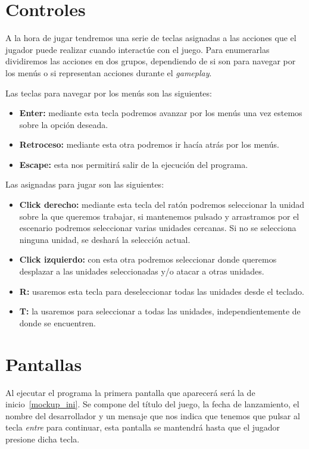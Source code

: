 \section{Controles}
A la hora de jugar tendremos una serie de teclas asignadas a las acciones que el
jugador puede realizar cuando interactúe con el juego. Para enumerarlas dividiremos las
acciones en dos grupos, dependiendo de si son para navegar por los menús o si
representan acciones durante el \textit{gameplay}.

Las teclas para navegar por los menús son las siguientes:

\begin{itemize}
	\item \textbf{Enter:} mediante esta tecla podremos avanzar por los menús una vez estemos sobre la opción deseada.
	\item \textbf{Retroceso:} mediante esta otra podremos ir hacía atrás por los menús.
	\item \textbf{Escape:} esta nos permitirá salir de la ejecución del programa.
\end{itemize}

Las asignadas para jugar son las siguientes:

\begin{itemize}
	\item \textbf{Click derecho:} mediante esta tecla del ratón podremos seleccionar la
	unidad sobre la que queremos trabajar, si mantenemos pulsado y arrastramos por el
	escenario podremos seleccionar varias unidades cercanas. Si no se selecciona ninguna
	unidad, se deshará la selección actual.
	\item \textbf{Click izquierdo:} con esta otra podremos seleccionar donde queremos
	desplazar a las unidades seleccionadas y/o atacar a otras unidades.
	\item \textbf{R:} usaremos esta tecla para deseleccionar todas las unidades desde
	el teclado.
	\item \textbf{T:} la usaremos para seleccionar a todas las unidades,
	independientemente de donde se encuentren.
\end{itemize}

\section{Pantallas}
Al ejecutar el programa la primera pantalla que aparecerá será la de 
inicio~\ref{mockup_ini}. Se compone del título del juego, la fecha de lanzamiento,
el nombre del desarrollador y un mensaje que nos indica que tenemos que pulsar al tecla
\textit{entre} para continuar, esta pantalla se mantendrá hasta que el jugador presione
dicha tecla.

